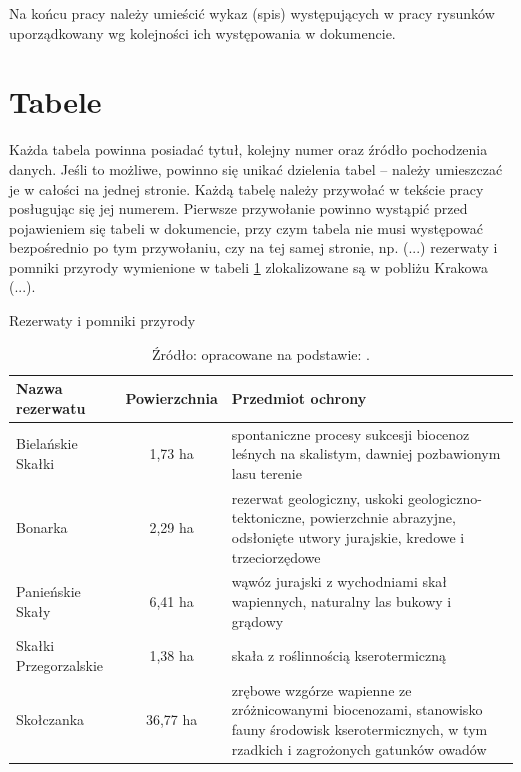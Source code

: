 Na końcu pracy należy umieścić wykaz (spis) występujących w pracy rysunków uporządkowany wg kolejności ich występowania w dokumencie.



\section{Tabele}

Każda tabela powinna posiadać tytuł, kolejny numer oraz źródło pochodzenia danych. Jeśli to możliwe, powinno się unikać dzielenia tabel -- należy umieszczać je w całości na jednej stronie. Każdą tabelę należy przywołać w tekście pracy posługując się jej numerem. Pierwsze przywołanie powinno wystąpić przed pojawieniem się tabeli w dokumencie, przy czym tabela nie musi występować bezpośrednio po tym przywołaniu, czy na tej samej stronie, np. (...) rezerwaty i pomniki przyrody wymienione w tabeli \ref{tab:rezerwaty} zlokalizowane są w pobliżu Krakowa (...).


\begin{table}[ht]
	\centering
	\caption{Rezerwaty i pomniki przyrody}
	\begin{tabularx}{\textwidth}{l c X}
		\hline
		\textbf{Nazwa rezerwatu} & \textbf{Powierzchnia}	& \textbf{Przedmiot ochrony}\\
		\hline
		Bielańskie Skałki		& 1,73 ha		& spontaniczne procesy sukcesji
												  biocenoz leśnych na skalistym,
												  dawniej pozbawionym lasu terenie\\
		Bonarka					& 2,29 ha		& rezerwat geologiczny, uskoki
												  geologiczno-tektoniczne,
												  powierzchnie abrazyjne,
												  odsłonięte utwory jurajskie,
												  kredowe i trzeciorzędowe\\
		Panieńskie Skały		& 6,41 ha		& wąwóz jurajski z wychodniami skał
												  wapiennych, naturalny las bukowy i grądowy\\
		Skałki Przegorzalskie	& 1,38 ha		& skała z roślinnością kserotermiczną\\
		Skołczanka				& 36,77 ha		& zrębowe wzgórze wapienne ze zróżnicowanymi
												  biocenozami, stanowisko fauny środowisk
												  kserotermicznych, w tym rzadkich
												  i zagrożonych gatunków owadów\\
		\hline		
	\end{tabularx}
	\caption*{Źródło: opracowane na podstawie: \citep{alexandrowicz1975katalog}.}
	\label{tab:rezerwaty}
\end{table}


